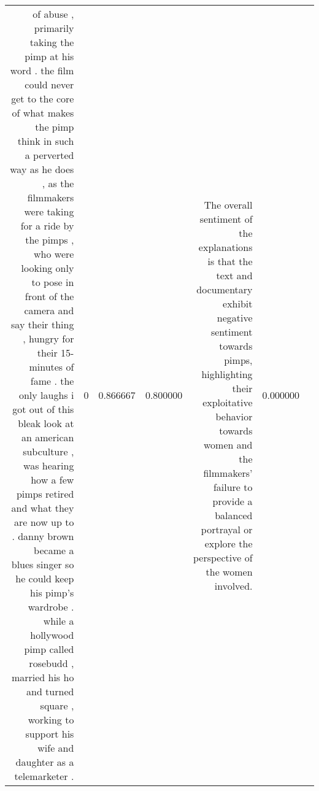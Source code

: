\begin{tabular}{rlrrrlr}
of abuse , primarily taking the pimp at his word .  the film could never get to the core of what makes the pimp think in such a perverted way as he does , as the filmmakers were taking for a ride by the pimps , who were looking only to pose in front of the camera and say their thing , hungry for their 15-minutes of fame .  the only laughs i got out of this bleak look at an american subculture , was hearing how a few pimps retired and what they are now up to .  danny brown became a blues singer so he could keep his pimp's wardrobe .  while a hollywood pimp called rosebudd , married his ho and turned square , working to support his wife and daughter as a telemarketer .   & 0 & 0.866667 & 0.800000 & The overall sentiment of the explanations is that the text and documentary exhibit negative sentiment towards pimps, highlighting their exploitative behavior towards women and the filmmakers' failure to provide a balanced portrayal or explore the perspective of the women involved. & 0.000000 \\

\end{tabular}
